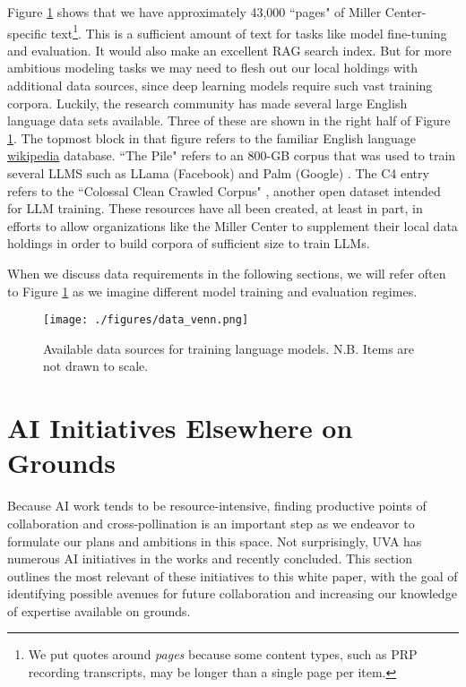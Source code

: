 \documentclass[12pt, oneside]{article}   	%
\begin{document}
Figure \ref{figure.data_venn} shows that we have approximately 43,000 ``pages" of Miller Center-specific text\footnote{We put quotes around \emph{pages} because some content types, such as PRP recording transcripts, may be longer than a single page per item.}.  This is a sufficient amount of text for tasks like model fine-tuning and evaluation.  It would also make an excellent RAG search index.  But for more ambitious modeling tasks we may need to flesh out our local holdings with additional data sources, since deep learning models require such vast training corpora.  Luckily, the research community has made several large English language data sets available.  Three of these are shown in the right half of Figure \ref{figure.data_venn}.  The topmost block in that figure refers to the familiar English language \href{en.wikipedia.org}{wikipedia} database.  ``The Pile" refers to an 800-GB corpus that was used to train several LLMS such as LLama (Facebook) and Palm (Google) \cite{pile:2020}.  The C4 entry refers to the ``Colossal Clean Crawled Corpus" \cite{c4:2021}, another open dataset intended for LLM training.  These resources have all been created, at least in part, in efforts to allow organizations like the Miller Center to supplement their local data holdings in order to build corpora of sufficient size to train LLMs.  

When we discuss data requirements in the following sections, we will refer often to Figure \ref{figure.data_venn} as we imagine different model training and evaluation regimes.




\begin{figure}[htbp]
\begin{center}
\texttt{[image: ./figures/data\_venn.png]}
\caption{Available data sources for training language models. N.B. Items are not drawn to scale.}
\label{figure.data_venn}
\end{center}
\end{figure}


\section{AI Initiatives Elsewhere on Grounds}\label{section.grounds}
Because AI work tends to be resource-intensive, finding productive points of collaboration and cross-pollination is an important step as we endeavor to formulate our plans and ambitions in this space.  Not surprisingly, UVA has numerous AI initiatives in the works and recently concluded.  This section outlines the most relevant of these initiatives to this white paper, with the goal of identifying possible avenues for future collaboration and increasing our knowledge of expertise available on grounds.
\end{document}
